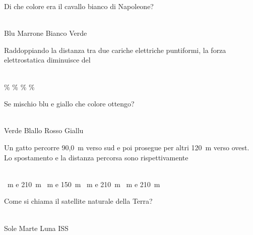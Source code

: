 \documentclass[a4paper,11pt]{exam}
\begin{document}
\begin{questions}
    
\question Di che colore era il cavallo bianco di Napoleone?\\\
\begin{oneparchoices}
  \choice Blu 
  \choice Marrone
  \choice Bianco
  \choice Verde
\end{oneparchoices}

    
\question Raddoppiando la distanza tra due cariche elettriche puntiformi, la forza elettrostatica diminuisce del\\\
\begin{oneparchoices}
  \choice 50\%
  \%
  \%
  \%
\end{oneparchoices}

    
\question Se mischio blu e giallo che colore ottengo?\\\
\begin{oneparchoices}
  \choice Verde
  \choice Blallo
  \choice Rosso
  \choice Giallu
\end{oneparchoices}

    
\question Un gatto percorre 90,0~m verso sud e poi prosegue per altri 120~m verso ovest. Lo spostamento e la distanza percorsa sono rispettivamente\\\
\begin{oneparchoices}
  \choice 30~m e 210~m
  ~m e 150~m
  \choice 150~m e 210~m
  \choice 210~m e 210~m
\end{oneparchoices}

    
\question Come si chiama il satellite naturale della Terra?\\\
\begin{oneparchoices}
  \choice Sole
  \choice Marte
  \choice Luna
  \choice ISS
\end{oneparchoices}


\end{questions}
\end{document}
